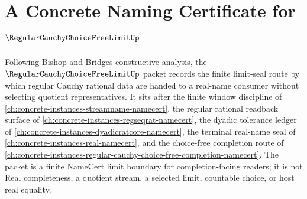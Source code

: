 \chapter{A Concrete Naming Certificate for $\RegularCauchyChoiceFreeLimitUp$}
\label{ch:concrete-instances-regular-cauchy-choice-free-limit-namecert}

Following Bishop and Bridges constructive analysis, the $\RegularCauchyChoiceFreeLimitUp$ packet records the finite limit-seal route by which regular Cauchy rational data are handed to a real-name consumer without selecting quotient representatives. It sits after the finite window discipline of \autoref{ch:concrete-instances-streamname-namecert}, the regular rational readback surface of \autoref{ch:concrete-instances-regseqrat-namecert}, the dyadic tolerance ledger of \autoref{ch:concrete-instances-dyadicratcore-namecert}, the terminal real-name seal of \autoref{ch:concrete-instances-real-namecert}, and the choice-free completion route of \autoref{ch:concrete-instances-regular-cauchy-choice-free-completion-namecert}. The packet is a finite NameCert limit boundary for completion-facing readers; it is not Real completeness, a quotient stream, a selected limit, countable choice, or host real equality.

